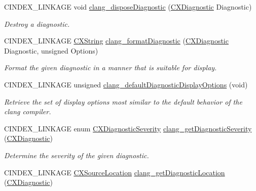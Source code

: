 \begin{DoxyCompactItemize}
\mbox{\label{group__CINDEX__DIAG_ga07061e0ad7665b7c5ee7253cd1bf4a5c}} 
C\+I\+N\+D\+E\+X\+\_\+\+L\+I\+N\+K\+A\+GE void \hyperlink{group__CINDEX__DIAG_ga07061e0ad7665b7c5ee7253cd1bf4a5c}{clang\+\_\+dispose\+Diagnostic} (\hyperlink{group__CINDEX__DIAG_ga44bb8aba7c40590ad25d1763c4fbff7f}{C\+X\+Diagnostic} Diagnostic)
\begin{DoxyCompactList}\small\item\em Destroy a diagnostic. \end{DoxyCompactList}\item 
C\+I\+N\+D\+E\+X\+\_\+\+L\+I\+N\+K\+A\+GE \hyperlink{structCXString}{C\+X\+String} \hyperlink{group__CINDEX__DIAG_ga455234ab6de0ca12c9ea36f8874060e8}{clang\+\_\+format\+Diagnostic} (\hyperlink{group__CINDEX__DIAG_ga44bb8aba7c40590ad25d1763c4fbff7f}{C\+X\+Diagnostic} Diagnostic, unsigned Options)
\begin{DoxyCompactList}\small\item\em Format the given diagnostic in a manner that is suitable for display. \end{DoxyCompactList}\item 
C\+I\+N\+D\+E\+X\+\_\+\+L\+I\+N\+K\+A\+GE unsigned \hyperlink{group__CINDEX__DIAG_ga5fcf910792541399efd63c62042ce353}{clang\+\_\+default\+Diagnostic\+Display\+Options} (void)
\begin{DoxyCompactList}\small\item\em Retrieve the set of display options most similar to the default behavior of the clang compiler. \end{DoxyCompactList}\item 
\mbox{\label{group__CINDEX__DIAG_gaff14261578eb9a2b02084f0cc6b95f9a}} 
C\+I\+N\+D\+E\+X\+\_\+\+L\+I\+N\+K\+A\+GE enum \hyperlink{group__CINDEX__DIAG_gabff210a02d448bf64e8aee79b2241370}{C\+X\+Diagnostic\+Severity} \hyperlink{group__CINDEX__DIAG_gaff14261578eb9a2b02084f0cc6b95f9a}{clang\+\_\+get\+Diagnostic\+Severity} (\hyperlink{group__CINDEX__DIAG_ga44bb8aba7c40590ad25d1763c4fbff7f}{C\+X\+Diagnostic})
\begin{DoxyCompactList}\small\item\em Determine the severity of the given diagnostic. \end{DoxyCompactList}\item 
C\+I\+N\+D\+E\+X\+\_\+\+L\+I\+N\+K\+A\+GE \hyperlink{structCXSourceLocation}{C\+X\+Source\+Location} \hyperlink{group__CINDEX__DIAG_gabfcf70ac15bb3e5ae39ef2c5e07c7428}{clang\+\_\+get\+Diagnostic\+Location} (\hyperlink{group__CINDEX__DIAG_ga44bb8aba7c40590ad25d1763c4fbff7f}{C\+X\+Diagnostic})

\end{DoxyCompactItemize}
